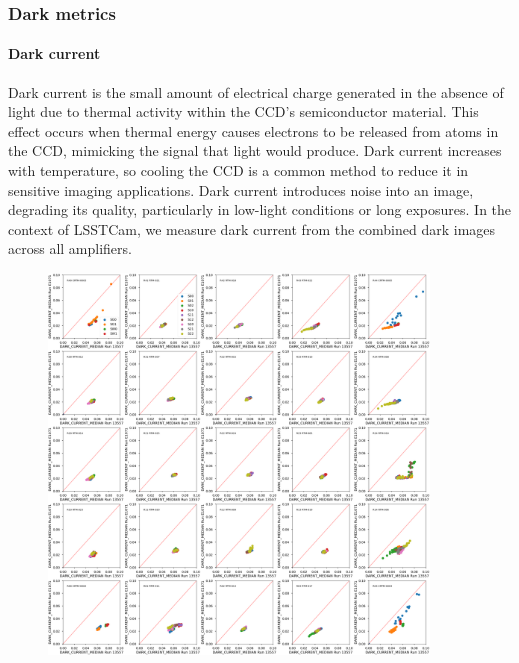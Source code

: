 \subsubsection{Dark metrics}\label{dark-metrics}

\paragraph{Dark current}\label{dark-current}

Dark current is the small amount of electrical charge generated in the
absence of light due to thermal activity within the CCD's semiconductor
material. This effect occurs when thermal energy causes electrons to be
released from atoms in the CCD, mimicking the signal that light would
produce. Dark current increases with temperature, so cooling the CCD is
a common method to reduce it in sensitive imaging applications. Dark
current introduces noise into an image, degrading its quality,
particularly in low-light conditions or long exposures. In the context
of LSSTCam, we measure dark current from the combined dark images across
all amplifiers.

\begin{figure}
\begin{centering}
\includegraphics[width=0.9\textwidth]{sections/figures/baselineCharacterization/13557_E1071_DARK_CURRENT_MEDIAN.png}
\end{centering}
\end{figure}

